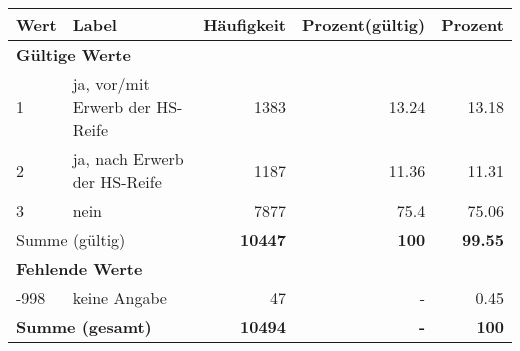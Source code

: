      \begin{longtable}{lXrrr}
     \toprule
     \textbf{Wert} & \textbf{Label} & \textbf{Häufigkeit} & \textbf{Prozent(gültig)} & \textbf{Prozent} \\
     \endhead
     \midrule
     \multicolumn{5}{l}{\textbf{Gültige Werte}}\\

     1 &
     \multicolumn{1}{X}{ ja, vor/mit Erwerb der HS-Reife   } &


       \num{1383} &
       \num[round-mode=places,round-precision=2]{13.24} &
         \num[round-mode=places,round-precision=2]{13.18} \\

     2 &
     \multicolumn{1}{X}{ ja, nach Erwerb der HS-Reife   } &


       \num{1187} &
       \num[round-mode=places,round-precision=2]{11.36} &
         \num[round-mode=places,round-precision=2]{11.31} \\

     3 &
     \multicolumn{1}{X}{ nein   } &


       \num{7877} &
       \num[round-mode=places,round-precision=2]{75.4} &
         \num[round-mode=places,round-precision=2]{75.06} \\
     \midrule
     \multicolumn{2}{l}{Summe (gültig)} &
       \textbf{\num{10447}} &
     \textbf{\num{100}} &
       \textbf{\num[round-mode=places,round-precision=2]{99.55}} \\
     \multicolumn{5}{l}{\textbf{Fehlende Werte}}\\
       -998 &
       keine Angabe &
         \num{47} &
        - &
         \num[round-mode=places,round-precision=2]{0.45} \\
     \midrule
     \multicolumn{2}{l}{\textbf{Summe (gesamt)}} &
          \textbf{\num{10494}} &
        \textbf{-} &
        \textbf{\num{100}} \\
     \bottomrule
     \end{longtable}
     
